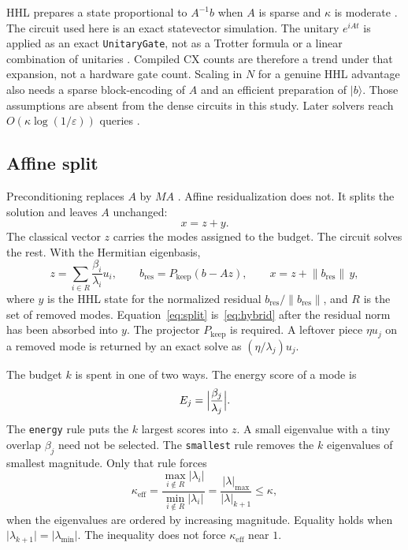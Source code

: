 \documentclass[11pt,a4paper]{article}
\begin{document}
HHL prepares a state proportional to \(A^{-1}b\) when \(A\) is sparse and \(\kappa\) is moderate \citep{harrow2009}.
The circuit used here is an exact statevector simulation.
The unitary \(e^{iAt}\) is applied as an exact \texttt{UnitaryGate}, not as a Trotter formula or a linear combination of unitaries \citep{gilyen2019}.
Compiled CX counts are therefore a trend under that expansion, not a hardware gate count.
Scaling in \(N\) for a genuine HHL advantage also needs a sparse block-encoding of \(A\) and an efficient preparation of \(\lvert b\rangle\).
Those assumptions are absent from the dense circuits in this study.
Later solvers reach \(O(\kappa\log(1/\varepsilon))\) queries \citep{costa2022,dalzell2024}.

\subsection{Affine split}
Preconditioning replaces \(A\) by \(MA\) \citep{clader2013}.
Affine residualization does not.
It splits the solution and leaves \(A\) unchanged:
\begin{equation}
  x=z+y.
  \label{eq:split}
\end{equation}
The classical vector \(z\) carries the modes assigned to the budget.
The circuit solves the rest.
With the Hermitian eigenbasis,
\begin{equation}
  z=\sum_{i\in R}\frac{\beta_i}{\lambda_i}u_i,
  \qquad
  b_{\mathrm{res}}=P_{\mathrm{keep}}(b-Az),
  \qquad
  x=z+\lVert b_{\mathrm{res}}\rVert\, y,
  \label{eq:hybrid}
\end{equation}
where \(y\) is the HHL state for the normalized residual \(b_{\mathrm{res}}/\lVert b_{\mathrm{res}}\rVert\), and \(R\) is the set of removed modes.
Equation~\eqref{eq:split} is~\eqref{eq:hybrid} after the residual norm has been absorbed into \(y\).
The projector \(P_{\mathrm{keep}}\) is required.
A leftover piece \(\eta u_j\) on a removed mode is returned by an exact solve as \((\eta/\lambda_j)u_j\).

The budget \(k\) is spent in one of two ways.
The energy score of a mode is
\begin{equation}
  E_j=\Bigl\lvert\frac{\beta_j}{\lambda_j}\Bigr\rvert.
\end{equation}
The \texttt{energy} rule puts the \(k\) largest scores into \(z\).
A small eigenvalue with a tiny overlap \(\beta_j\) need not be selected.
The \texttt{smallest} rule removes the \(k\) eigenvalues of smallest magnitude.
Only that rule forces
\begin{equation}
  \kappa_{\mathrm{eff}}
  =\frac{\max_{i\notin R}\lvert\lambda_i\rvert}{\min_{i\notin R}\lvert\lambda_i\rvert}
  =\frac{\lvert\lambda\rvert_{\max}}{\lvert\lambda\rvert_{k+1}}
  \le\kappa,
\end{equation}
when the eigenvalues are ordered by increasing magnitude.
Equality holds when \(\lvert\lambda_{k+1}\rvert=\lvert\lambda_{\min}\rvert\).
The inequality does not force \(\kappa_{\mathrm{eff}}\) near \(1\).
\end{document}
